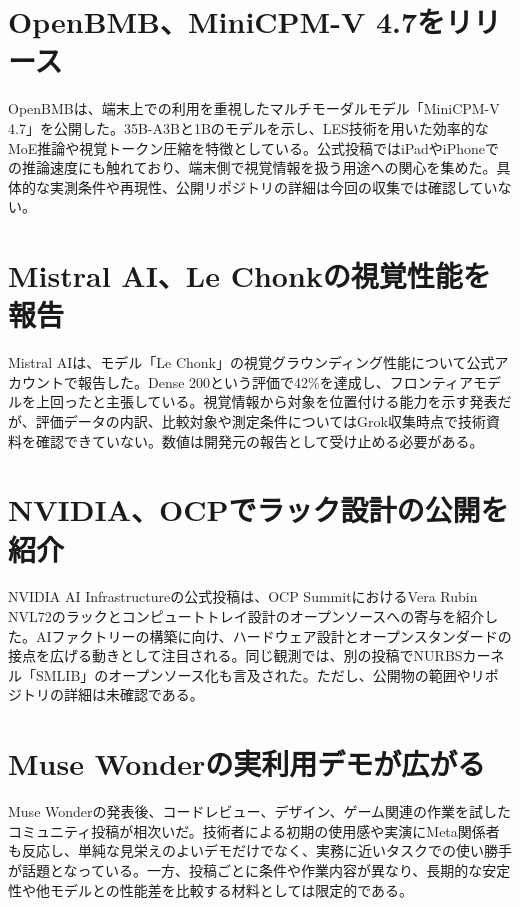 \section{OpenBMB、MiniCPM-V 4.7をリリース}
OpenBMBは、端末上での利用を重視したマルチモーダルモデル「MiniCPM-V 4.7」を公開した。35B-A3Bと1Bのモデルを示し、LES技術を用いた効率的なMoE推論や視覚トークン圧縮を特徴としている。公式投稿ではiPadやiPhoneでの推論速度にも触れており、端末側で視覚情報を扱う用途への関心を集めた。具体的な実測条件や再現性、公開リポジトリの詳細は今回の収集では確認していない。

\section{Mistral AI、Le Chonkの視覚性能を報告}
Mistral AIは、モデル「Le Chonk」の視覚グラウンディング性能について公式アカウントで報告した。Dense 200という評価で42\%を達成し、フロンティアモデルを上回ったと主張している。視覚情報から対象を位置付ける能力を示す発表だが、評価データの内訳、比較対象や測定条件についてはGrok収集時点で技術資料を確認できていない。数値は開発元の報告として受け止める必要がある。

\section{NVIDIA、OCPでラック設計の公開を紹介}
NVIDIA AI Infrastructureの公式投稿は、OCP SummitにおけるVera Rubin NVL72のラックとコンピュートトレイ設計のオープンソースへの寄与を紹介した。AIファクトリーの構築に向け、ハードウェア設計とオープンスタンダードの接点を広げる動きとして注目される。同じ観測では、別の投稿でNURBSカーネル「SMLIB」のオープンソース化も言及された。ただし、公開物の範囲やリポジトリの詳細は未確認である。

\section{Muse Wonderの実利用デモが広がる}
Muse Wonderの発表後、コードレビュー、デザイン、ゲーム関連の作業を試したコミュニティ投稿が相次いだ。技術者による初期の使用感や実演にMeta関係者も反応し、単純な見栄えのよいデモだけでなく、実務に近いタスクでの使い勝手が話題となっている。一方、投稿ごとに条件や作業内容が異なり、長期的な安定性や他モデルとの性能差を比較する材料としては限定的である。

